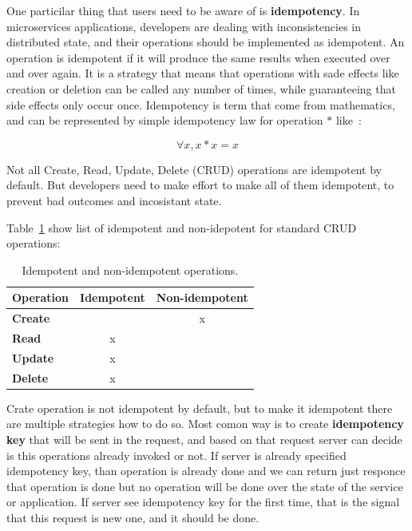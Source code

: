 One particilar thing that users need to be aware of is \textbf{idempotency}. In microservices applications, developers are dealing with inconsistencies in distributed state, and their operations should be implemented as idempotent. An operation is idempotent if it will produce the same results when executed over and over again. It is a strategy that means that operations with sade effects like creation or deletion can be called any number of times, while guaranteeing that side effects only occur once. Idempotency is term that come from mathematics, and can be represented by simple idempotency law for operation $*$ like~\cite{gratzer2002general}:

\begin{equation}\label{form:idempotency_law}
	\forall x, x * x = x
\end{equation}

Not all Create, Read, Update, Delete (CRUD) operations are idempotent by default. But developers need to make effort to make all of them idempotent, to prevent bad outcomes and incosistant state. 

Table~\ref{tab:table8} show list of idempotent and non-idepotent for standard CRUD operations:

\begin{table}[h!]
	\begin{center}
		\begin{tabular}{l|c|c}
			\textbf{Operation} & \textbf{Idempotent} & \textbf{Non-idempotent}\\
			\hline
			\textbf{Create} &  & x \\
			\textbf{Read} & x & \\
			\textbf{Update} & x & \\
			\textbf{Delete} & x & \\
		\end{tabular}
	\end{center}
	\vspace{-0.5cm}
	\caption{Idempotent and non-idempotent operations.}
	\label{tab:table8}
\end{table}

Crate operation is not idempotent by default, but to make it idempotent there are multiple strategies how to do so. Most comon way is to create \textbf{idempotency key} that will be sent in the request, and based on that request server can decide is this operations already invoked or not. If server is already  specified idempotency key, than operation is already done and we can return just responce that operation is done but no operation will be done over the state of the service or application. If server see idempotency key for the first time, that is the signal that this request is new one, and it should be done.

